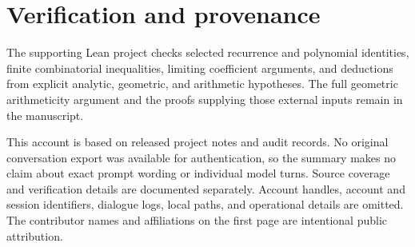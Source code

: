 \documentclass[11pt]{article}
\begin{document}
\section{Verification and provenance}

The supporting Lean project checks selected recurrence and polynomial
identities, finite combinatorial inequalities, limiting coefficient
arguments, and deductions from explicit analytic, geometric, and
arithmetic hypotheses. The full geometric arithmeticity argument and the
proofs supplying those external inputs remain in the manuscript.

This account is based on released project notes and audit records. No
original conversation export was available for authentication, so the
summary makes no claim about exact prompt wording or individual model
turns. Source coverage and verification details are documented separately.
Account handles, account and session identifiers, dialogue logs, local
paths, and operational details are omitted. The contributor names and
affiliations on the first page are intentional public attribution.
\end{document}
